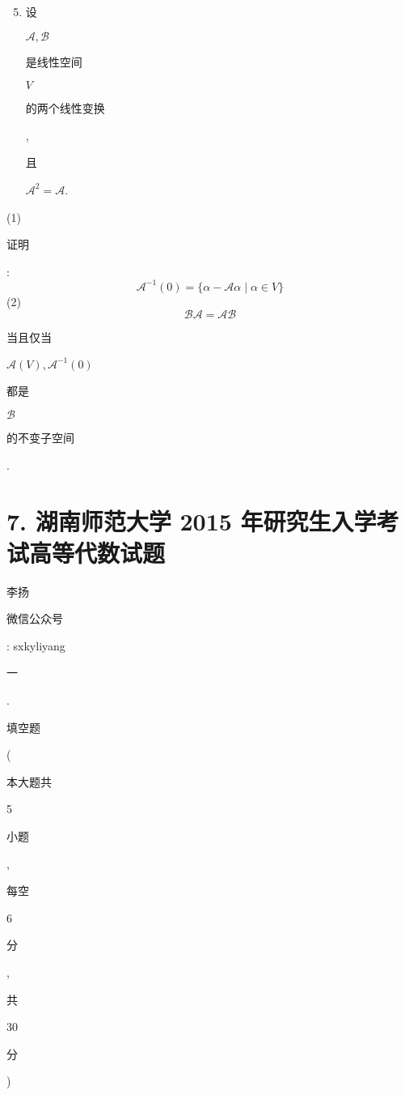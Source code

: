 \documentclass[10pt]{article}
\begin{document}
\begin{enumerate}
  \setcounter{enumi}{4}
  \item \begin{CJK}{UTF8}{mj}设\end{CJK} $\mathscr{A}, \mathscr{B}$ \begin{CJK}{UTF8}{mj}是线性空间\end{CJK} $V$ \begin{CJK}{UTF8}{mj}的两个线性变换\end{CJK}, \begin{CJK}{UTF8}{mj}且\end{CJK} $\mathscr{A}^{2}=\mathscr{A}$.
\end{enumerate}
(1) \begin{CJK}{UTF8}{mj}证明\end{CJK}:
$$
\mathscr{A}^{-1}(0)=\{\alpha-\mathscr{A} \alpha \mid \alpha \in V\}
$$
(2)
$$
\mathscr{B} \mathscr{A}=\mathscr{A} \mathscr{B}
$$
\begin{CJK}{UTF8}{mj}当且仅当\end{CJK} $\mathscr{A}(V), \mathscr{A}^{-1}(0)$ \begin{CJK}{UTF8}{mj}都是\end{CJK} $\mathscr{B}$ \begin{CJK}{UTF8}{mj}的不变子空间\end{CJK}.

\section{7. 湖南师范大学 2015 年研究生入学考试高等代数试题}
\begin{CJK}{UTF8}{mj}李扬\end{CJK}

\begin{CJK}{UTF8}{mj}微信公众号\end{CJK}: sxkyliyang

\begin{CJK}{UTF8}{mj}一\end{CJK}. \begin{CJK}{UTF8}{mj}填空题\end{CJK} (\begin{CJK}{UTF8}{mj}本大题共\end{CJK} 5 \begin{CJK}{UTF8}{mj}小题\end{CJK}, \begin{CJK}{UTF8}{mj}每空\end{CJK} 6 \begin{CJK}{UTF8}{mj}分\end{CJK}, \begin{CJK}{UTF8}{mj}共\end{CJK} 30 \begin{CJK}{UTF8}{mj}分\end{CJK})
\end{document}
